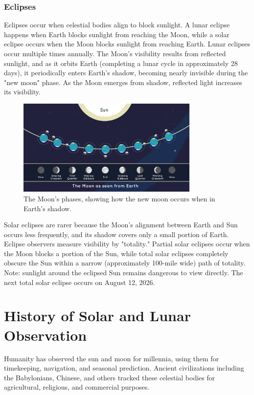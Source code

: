 \documentclass[12pt,oneside,a4paper,english]{article}
\begin{document}
\subsubsection{Eclipses}
Eclipses occur when celestial bodies align to block sunlight. A lunar eclipse happens when Earth blocks sunlight from reaching the Moon, while a solar eclipse occurs when the Moon blocks sunlight from reaching Earth. Lunar eclipses occur multiple times annually. The Moon's visibility results from reflected sunlight, and as it orbits Earth (completing a lunar cycle in approximately 28 days), it periodically enters Earth's shadow, becoming nearly invisible during the "new moon" phase. As the Moon emerges from shadow, reflected light increases its visibility.

\begin{figure}[H]
    \centering
    \includegraphics[width=0.8\textwidth]{moon-phases-jpl.png}
    \caption{The Moon's phases, showing how the new moon occurs when in Earth's shadow.\cite{moonphase}}
\end{figure}

Solar eclipses are rarer because the Moon's alignment between Earth and Sun occurs less frequently, and its shadow covers only a small portion of Earth. Eclipse observers measure visibility by "totality." Partial solar eclipses occur when the Moon blocks a portion of the Sun, while total solar eclipses completely obscure the Sun within a narrow (approximately 100-mile wide) path of totality. Note: sunlight around the eclipsed Sun remains dangerous to view directly. The next total solar eclipse occurs on August 12, 2026.

\section{History of Solar and Lunar Observation}
Humanity has observed the sun and moon for millennia, using them for timekeeping, navigation, and seasonal prediction. Ancient civilizations including the Babylonians, Chinese, and others tracked these celestial bodies for agricultural, religious, and commercial purposes.
\end{document}
